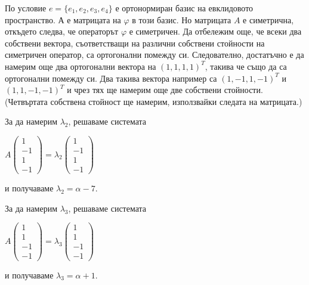\documentclass{article}
\begin{document}
\justify
По условие $e = \{e_1, e_2, e_3, e_4\}$ е ортонормиран базис на евклидовото пространство. $А$ е матрицата на $\varphi$ в този базис. Но матрицата $A$ е симетрична, откъдето следва, че операторът $\varphi$ е симетричен. Да отбележим още, че всеки два собствени вектора, съответстващи на различни собствени стойности на симетричен оператор, са ортогонални помежду си. Следователно, достатъчно е да намерим още два ортогонални вектора на $(1,1,1,1)^{T}$, такива че също да са ортогонални помежду си. Два такива вектора например са $(1,-1,1,-1)^{T}$ и $(1,1,-1,-1)^{T}$ и чрез тях ще намерим още две собствени стойности. (Четвъртата собствена стойност ще намерим, използвайки следата на матрицата.)

\justify
За да намерим $\lambda_2$, решаваме системата

\begin{center}
    $A\begin{pmatrix}
         1 \\
         -1 \\
         1 \\
         -1
         \end{pmatrix} = \lambda_2 \begin{pmatrix}
         1 \\
         -1 \\
         1 \\
         -1
         \end{pmatrix}$
\end{center}

\justify
и получаваме $\lambda_2 = \alpha - 7$.

\justify
За да намерим $\lambda_3$, решаваме системата

\begin{center}
    $A\begin{pmatrix}
         1 \\
         1 \\
         -1 \\
         -1
         \end{pmatrix} = \lambda_3 \begin{pmatrix}
         1 \\
         1 \\
         -1 \\
         -1
         \end{pmatrix}$
\end{center}

\justify
и получаваме $\lambda_3 = \alpha + 1$.
\end{document}
